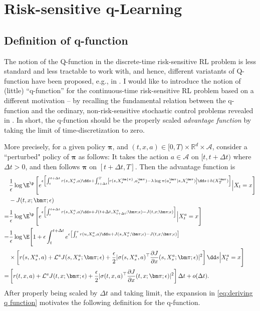 \section{Risk-sensitive q-Learning}
\label{sec:risk sensitive q learning}
\subsection{Definition of q-function}
The notion of the Q-function in the discrete-time risk-sensitive RL problem is less standard and less tractable to work with, and hence, different variatants of Q-function have been proposed, e.g., in \citet{fei2021exponential}. I would like to introduce the notion of (little) ``q-function'' for the continuous-time risk-sensitive RL problem based on a different motivation -- by recalling the fundamental relation between the q-function and the ordinary, non-risk-sensitive stochastic control problems revealed in \citet{jia2022q}. In short, the q-function should be the properly scaled \textit{advantage function} by taking the limit of time-discretization to zero.

More precisely, for a given policy $\bm\pi$, and $(t,x,a)\in [0,T)\times \mathbb{R}^d\times \mathcal{A}$, consider a  ``perturbed" policy of $\bm{\pi}$ as follows: It takes the action $a\in \mathcal{A}$ on $[t,t+\Delta t)$ where $\Delta t>0$, and then follows $\bm{\pi}$ on $[t+\Delta t,T]$. Then the advantage function is  
\begin{equation}
	\label{eq:deriving q function}
	\begin{aligned}
		& \frac{1}{\epsilon}\log\E^{\p}\left[e^{\epsilon \left[\int_t^{t+\Delta t}r(s,X_s^a,a)\dd s + \int_{t+\Delta t}^T \left[ r(s,X_s^{\bm{\pi}},a_s^{\bm \pi}) - \lambda \log\pi(a_s^{\bm\pi}|s,X_s^{\bm\pi}) \right] \dd s + h(X_T^{\bm \pi}) \right]} \Big|X_t = x\right]\\
		& - J(t,x;\bm\pi;\epsilon) \\
		= & \frac{1}{\epsilon}\log\E^{\p}\left[e^{\epsilon \left[\int_t^{t+\Delta t}r(s,X_s^a,a)\dd s + J(t+\Delta t, X_{t+\Delta t}^{a};\bm\pi;\epsilon)  - J(t,x;\bm\pi;\epsilon) \right]} \Big|X_t^a = x\right] \\
		= & \frac{1}{\epsilon}\log\E\Bigg[1 + \epsilon \int_t^{t+\Delta t} e^{\epsilon \left[\int_t^{s}r(u,X_{u}^a,a)\dd u + J(s, X_{s}^{a};\bm\pi;\epsilon)  - J(t,x;\bm\pi;\epsilon) \right]} \\
		&\times  \left[ r(s,X_s^a,a) + \mathcal{L}^a J(s,X_s^a;\bm\pi;\epsilon) +  \frac{\epsilon}{2} |\sigma(s,X_s^a,a)^\top\frac{\partial J}{\partial x}(s,X_s^a;\bm\pi;\epsilon)|^2  \right]\dd s    \Big| X_t^a = x\Bigg] \\
		= & \left[ r(t,x,a) + \mathcal{L}^a J(t,x;\bm\pi;\epsilon) +  \frac{\epsilon}{2} |\sigma(t,x,a)^\top\frac{\partial J}{\partial x}(t,x;\bm\pi;\epsilon)|^2 \right] \Delta t+ o(\Delta t).
	\end{aligned}
\end{equation}
After properly being scaled by $\Delta t$ and taking limit, the expansion in \eqref{eq:deriving q function} motivates the following definition for the q-function.

